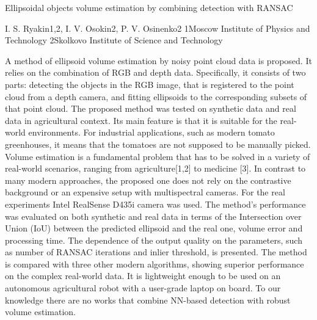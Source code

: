 
Ellipsoidal objects volume estimation by combining detection with RANSAC

I. S. Ryakin1,2, I. V. Osokin2, P. V. Osinenko2
1Moscow Institute of Physics and Technology
2Skolkovo Institute of Science and Technology

A method of ellipsoid volume estimation by noisy point cloud data is proposed. It relies on the combination of RGB and depth data. Specifically, it consists of two parts: detecting the objects in the RGB image, that is registered to the point cloud from a depth camera, and fitting ellipsoids to the corresponding subsets of that point cloud. The proposed method was tested on synthetic data and real data in agricultural context. Its main feature is that it is suitable for the real-world environments. For industrial applications, such as modern tomato greenhouses, it means that the tomatoes are not supposed to be manually picked.
	Volume estimation is a fundamental problem that has to be solved in a variety of real-world scenarios, ranging from agriculture[1,2] to medicine [3]. In contrast to many modern approaches, the proposed one does not rely on the contrastive background or an expensive setup with multispectral cameras. For the real experiments Intel RealSense D435i camera was used. The method's performance was evaluated on both synthetic and real data in terms of the Intersection over Union (IoU) between the predicted ellipsoid and the real one, volume error and processing time. The dependence of the output quality on the parameters, such as number of RANSAC iterations and inlier threshold, is presented. The method is compared with three other modern algorithms, showing superior performance on the complex real-world data. It is lightweight enough to be used on an autonomous agricultural robot with a user-grade laptop on board. To our knowledge there are no works that combine NN-based detection with robust volume estimation.


